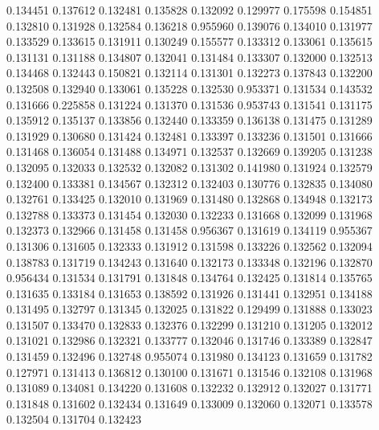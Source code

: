 0.134451
0.137612
0.132481
0.135828
0.132092
0.129977
0.175598
0.154851
0.132810
0.131928
0.132584
0.136218
0.955960
0.139076
0.134010
0.131977
0.133529
0.133615
0.131911
0.130249
0.155577
0.133312
0.133061
0.135615
0.131131
0.131188
0.134807
0.132041
0.131484
0.133307
0.132000
0.132513
0.134468
0.132443
0.150821
0.132114
0.131301
0.132273
0.137843
0.132200
0.132508
0.132940
0.133061
0.135228
0.132530
0.953371
0.131534
0.143532
0.131666
0.225858
0.131224
0.131370
0.131536
0.953743
0.131541
0.131175
0.135912
0.135137
0.133856
0.132440
0.133359
0.136138
0.131475
0.131289
0.131929
0.130680
0.131424
0.132481
0.133397
0.133236
0.131501
0.131666
0.131468
0.136054
0.131488
0.134971
0.132537
0.132669
0.139205
0.131238
0.132095
0.132033
0.132532
0.132082
0.131302
0.141980
0.131924
0.132579
0.132400
0.133381
0.134567
0.132312
0.132403
0.130776
0.132835
0.134080
0.132761
0.133425
0.132010
0.131969
0.131480
0.132868
0.134948
0.132173
0.132788
0.133373
0.131454
0.132030
0.132233
0.131668
0.132099
0.131968
0.132373
0.132966
0.131458
0.131458
0.956367
0.131619
0.134119
0.955367
0.131306
0.131605
0.132333
0.131912
0.131598
0.133226
0.132562
0.132094
0.138783
0.131719
0.134243
0.131640
0.132173
0.133348
0.132196
0.132870
0.956434
0.131534
0.131791
0.131848
0.134764
0.132425
0.131814
0.135765
0.131635
0.133184
0.131653
0.138592
0.131926
0.131441
0.132951
0.134188
0.131495
0.132797
0.131345
0.132025
0.131822
0.129499
0.131888
0.133023
0.131507
0.133470
0.132833
0.132376
0.132299
0.131210
0.131205
0.132012
0.131021
0.132986
0.132321
0.133777
0.132046
0.131746
0.133389
0.132847
0.131459
0.132496
0.132748
0.955074
0.131980
0.134123
0.131659
0.131782
0.127971
0.131413
0.136812
0.130100
0.131671
0.131546
0.132108
0.131968
0.131089
0.134081
0.134220
0.131608
0.132232
0.132912
0.132027
0.131771
0.131848
0.131602
0.132434
0.131649
0.133009
0.132060
0.132071
0.133578
0.132504
0.131704
0.132423
